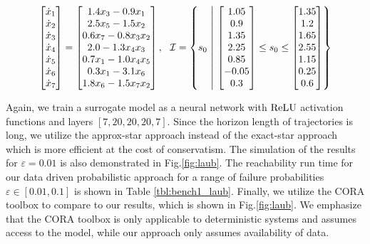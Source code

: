 \begin{equation}
\label{eq:laubloomis}
\begin{bmatrix}\dot{x}_1\\ \dot{x}_2\\ \dot{x}_3\\ \dot{x}_4\\
\dot{x}_5\\ \dot{x}_6\\ \dot{x}_7\end{bmatrix} =\begin{bmatrix} 1.4 x_3-0.9 x_1\\ 2.5 x_5-1.5 x_2\\
0.6  x_7-0.8 x_3 x_2\\ 2.0-1.3 x_4 x_3\\ 0.7 x_1-1.0 x_4 x_5\\ 0.3 x_1-3.1 x_6 \\ 1.8 x_6-1.5  x_7 x_2
 \end{bmatrix}, \ \  \mathcal{I}=\left\{  s_0\ \middle| \  \begin{bmatrix} 1.05\\ 0.9\\ 1.35\\ 2.25\\ 0.85\\ -0.05\\ 0.3 \end{bmatrix} \leq s_0 \leq \begin{bmatrix} 1.35\\ 1.2\\ 1.65\\ 2.55\\ 1.15\\ 0.25\\ 0.6\end{bmatrix} \right\}
\end{equation}

Again, we train a surrogate model as a neural network with $\mathrm{ReLU}$ activation functions and layers $[7,20,20,20,7]$.  Since the horizon length of trajectories is long, we utilize the approx-star approach instead of the exact-star approach which is more efficient at the cost of conservatism. The simulation of the results for $\varepsilon = 0.01$ is also demonstrated in Fig.\ref{fig:laub}. The reachability run time for our data driven probabilistic approach for a range of failure probabilities $\varepsilon \in [0.01, 0.1 ]$ is shown in Table \ref{tbl:bench1_laub}. Finally, we  utilize the CORA toolbox \cite{althoff2015introduction} to compare to our results, which is shown in Fig.\ref{fig:laub}. We emphasize that  the CORA toolbox is only applicable to deterministic systems and assumes access to the model, while our approach only assumes availability of data.



